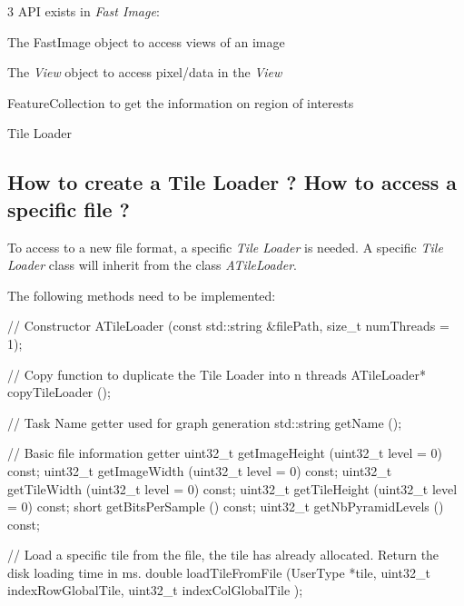 3 A\+PI exists in {\itshape Fast Image}\+:
\begin{DoxyEnumerate}
\item The Fast\+Image object to access views of an image
\item The {\itshape View} object to access pixel/data in the {\itshape View}
\item Feature\+Collection to get the information on region of interests
\item Tile Loader
\end{DoxyEnumerate}

\subsection*{How to create a Tile Loader ? How to access a specific file ?}

To access to a new file format, a specific {\itshape Tile Loader} is needed. A specific {\itshape Tile Loader} class will inherit from the class {\itshape A\+Tile\+Loader}.

The following methods need to be implemented\+: 
\begin{DoxyCode}
\textcolor{comment}{// Constructor}
ATileLoader                       (\textcolor{keyword}{const} std::string &filePath, \textcolor{keywordtype}{size\_t} numThreads = 1);

\textcolor{comment}{// Copy function to duplicate the Tile Loader into n threads }
ATileLoader*  copyTileLoader      ();

\textcolor{comment}{// Task Name getter used for graph generation }
std::string   getName             ();

\textcolor{comment}{// Basic file information getter }
uint32\_t      getImageHeight      (uint32\_t level = 0) \textcolor{keyword}{const};
uint32\_t      getImageWidth       (uint32\_t level = 0) \textcolor{keyword}{const};
uint32\_t      getTileWidth        (uint32\_t level = 0) \textcolor{keyword}{const};
uint32\_t      getTileHeight       (uint32\_t level = 0) \textcolor{keyword}{const};
\textcolor{keywordtype}{short}         getBitsPerSample    () \textcolor{keyword}{const};
uint32\_t      getNbPyramidLevels  () \textcolor{keyword}{const};

\textcolor{comment}{// Load a specific tile from the file, the tile has already allocated. Return the disk loading time in ms.}
\textcolor{keywordtype}{double}        loadTileFromFile    (UserType *tile, uint32\_t indexRowGlobalTile, uint32\_t indexColGlobalTile
      );
\end{DoxyCode}


